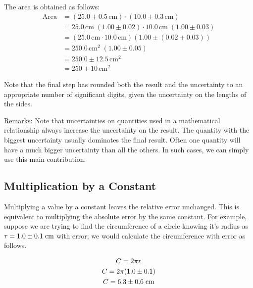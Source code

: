 \documentclass[letterpaper, 12pt]{book}
\newcommand{\myskip}{\vspace{0.5\baselineskip}}
\begin{document}
The area is obtained as follows:
\begin{equation}
    \begin{split}
        \text{Area} &= \left( 25.0\pm 0.5\,\mathrm{cm} \right)\cdot\left( 10.0\pm 0.3\,\mathrm{cm} \right) \\
        &= 25.0\,\mathrm{cm}\;\left( 1.00\pm 0.02 \right)\cdot 10.0\,\mathrm{cm}\;\left( 1.00\pm 0.03 \right) \\
        &= \left( 25.0\,\mathrm{cm}\cdot 10.0\,\mathrm{cm} \right)\left( 1.00\pm \left( 0.02 + 0.03 \right) \right) \\
        &= 250.0\,\mathrm{cm}^2\;(1.00 \pm 0.05) \\
        &= 250.0\pm 12.5\,\mathrm{cm}^2 \\
        &= 250 \pm 10\,\mathrm{cm}^2
    \end{split}
\end{equation}

Note that the final step has rounded both the result and the uncertainty to an appropriate number of significant digits, given the uncertainty on the lengths of the sides. \myskip

\underline{Remarks:} Note that uncertainties on quantities used in a mathematical relationship always increase the uncertainty on the result. The quantity with the biggest uncertainty usually dominates the final result. Often one quantity will have a much bigger uncertainty than all the others. In such cases, we can simply use this main contribution.

\subsection{Multiplication by a Constant}

Multiplying a value by a constant leaves the relative error unchanged. This is equivalent to multiplying the absolute error by the same constant. For example, suppose we are trying to find the circumference of a circle knowing it's radius as $r=1.0 \pm 0.1 \hspace{1mm} \text{cm}$ with error; we would calculate the circumference with error as follows.

\begin{gather}
C = 2\pi r \nonumber \\
 C= 2\pi (1.0 \pm 0.1) \\
 C=6.3 \pm 0.6 \hspace{1mm}  \text{cm} \nonumber
\end{gather}
\end{document}
